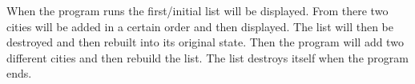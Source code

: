 When the program runs the first/initial list will be displayed. From there two cities will be added in a certain order and then displayed. The list will then be destroyed and then rebuilt into its original state. Then the program will add two different cities and then rebuild the list. The list destroys itself when the program ends. 